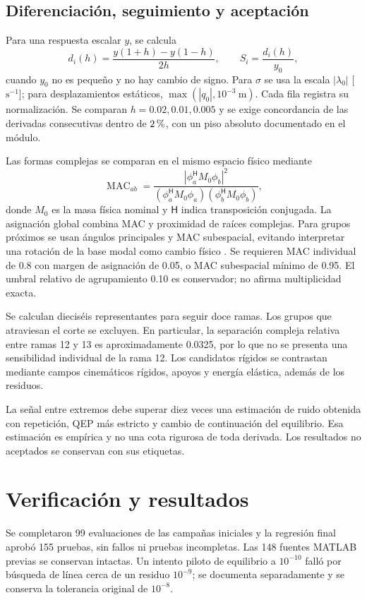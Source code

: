 \documentclass[11pt,a4paper]{article}
\begin{document}
\subsection{Diferenciación, seguimiento y aceptación}
Para una respuesta escalar $y$, se calcula
\begin{equation}
d_i(h)=\frac{y(1+h)-y(1-h)}{2h},\qquad
S_i=\frac{d_i(h)}{y_0},
\end{equation}
cuando $y_0$ no es pequeño y no hay cambio de signo. Para $\sigma$ se usa la escala $|\lambda_0|$ [$\mathrm{s}^{-1}$]; para desplazamientos estáticos, $\max(|q_0|,10^{-3}\ \mathrm{m})$. Cada fila registra su normalización. Se comparan $h=0.02,0.01,0.005$ y se exige concordancia de las derivadas consecutivas dentro de $2\,\text{\char37}$, con un piso absoluto documentado en el módulo.

Las formas complejas se comparan en el mismo espacio físico mediante
\begin{equation}
\operatorname{MAC}_{ab}=\frac{|\phi_a^{\mathsf H}M_0\phi_b|^2}
{(\phi_a^{\mathsf H}M_0\phi_a)(\phi_b^{\mathsf H}M_0\phi_b)},
\end{equation}
donde $M_0$ es la masa física nominal y $\mathsf H$ indica transposición conjugada. La asignación global combina MAC y proximidad de raíces complejas. Para grupos próximos se usan ángulos principales y MAC subespacial, evitando interpretar una rotación de la base modal como cambio físico \cite{allemang2003}. Se requieren MAC individual de 0.8 con margen de asignación de 0.05, o MAC subespacial mínimo de 0.95. El umbral relativo de agrupamiento 0.10 es conservador; no afirma multiplicidad exacta.

Se calculan dieciséis representantes para seguir doce ramas. Los grupos que atraviesan el corte se excluyen. En particular, la separación compleja relativa entre ramas 12 y 13 es aproximadamente 0.0325, por lo que no se presenta una sensibilidad individual de la rama 12. Los candidatos rígidos se contrastan mediante campos cinemáticos rígidos, apoyos y energía elástica, además de los residuos.

La señal entre extremos debe superar diez veces una estimación de ruido obtenida con repetición, QEP más estricto y cambio de continuación del equilibrio. Esa estimación es empírica y no una cota rigurosa de toda derivada. Los resultados no aceptados se conservan con sus etiquetas.

\section{Verificación y resultados}
Se completaron 99 evaluaciones de las campañas iniciales y la regresión final aprobó 155 pruebas, sin fallos ni pruebas incompletas. Las 148 fuentes MATLAB previas se conservan intactas. Un intento piloto de equilibrio a $10^{-10}$ falló por búsqueda de línea cerca de un residuo $10^{-9}$; se documenta separadamente y se conserva la tolerancia original de $10^{-8}$.
\end{document}
